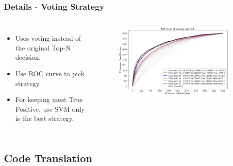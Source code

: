 \documentclass{beamer}[fullspacing]
\begin{document}
\begin{frame}
\frametitle{Details - Voting Strategy}

\begin{columns}
\begin{itemize}
\item
Uses voting instead of the original Top-N decision.
\item
Use ROC curve to pick strategy.
\item
For keeping most True Positive, use SVM only is the best strategy.
\end{itemize}

\begin{figure}
\includegraphics[scale=0.2]{image/roccurve.png}
\end{figure}
\end{columns}
\end{frame}





\subsection{Code Translation}
\end{document}
